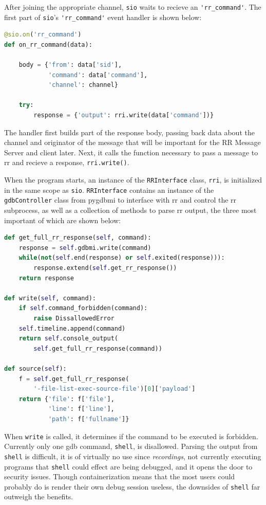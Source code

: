 \documentclass[12pt]{article}
\begin{document}
After joining the appropriate channel, \lstinline{sio} waits to
recieve an \lstinline{'rr_command'}.  The first part of
\lstinline{sio}'s \lstinline{'rr_command'} event handler is shown below:

\begin{lstlisting}[language=Python,basicstyle=\linespread{0.5}\ttfamily,caption={RR Command Event Handler},captionpos=b]
@sio.on('rr_command')
def on_rr_command(data):

    body = {'from': data['sid'],
            'command': data['command'],
            'channel': channel}
    
    try:
        response = {'output': rri.write(data['command'])}
\end{lstlisting}

The handler first builds part of the response body, passing back data
about the channel and originator of the message that will be important
for the RR Message Server and client later.  Next, it calls the
function necessary to pass a message to rr and recieve a response,
\lstinline{rri.write()}.
\par

When the program starts, an instance of the \lstinline{RRInterface}
class, \lstinline{rri}, is initialized in the same scope as
\lstinline{sio}.  \lstinline{RRInterface} contains an instance of the
\lstinline{gdbController} class from pygdbmi to interface with rr and
control the rr subprocess, as well as a collection of methods to parse
rr output, the three most important of which are shown below: 

\begin{lstlisting}[language=Python,basicstyle=\linespread{0.5}\ttfamily,caption={RRInterface},captionpos=b]
def get_full_rr_response(self, command):
    response = self.gdbmi.write(command)
    while(not(self.end(response) or self.exited(response))):
        response.extend(self.get_rr_response())
    return response

def write(self, command):
    if self.command_forbidden(command):
        raise DissallowedError
    self.timeline.append(command)
    return self.console_output(
        self.get_full_rr_response(command))

def source(self):
    f = self.get_full_rr_response(
        '-file-list-exec-source-file')[0]['payload']
    return {'file': f['file'],
            'line': f['line'],
            'path': f['fullname']}
\end{lstlisting}

When \lstinline{write} is called, it determines if the command to be
executed is forbidden.  Currently only one gdb command,
\lstinline{shell}, is disallowed.  Parsing the output from
\lstinline{shell} is difficult, it is of virtually no use since
\textit{recordings}, not currently executing programs that
\lstinline{shell} could effect are being debugged, and it opens the
door to security issues.  Though containerization means that the most
users could probably do is render their own debug session useless, the
downsides of \lstinline{shell} far outweigh the benefits.
\par
\end{document}
